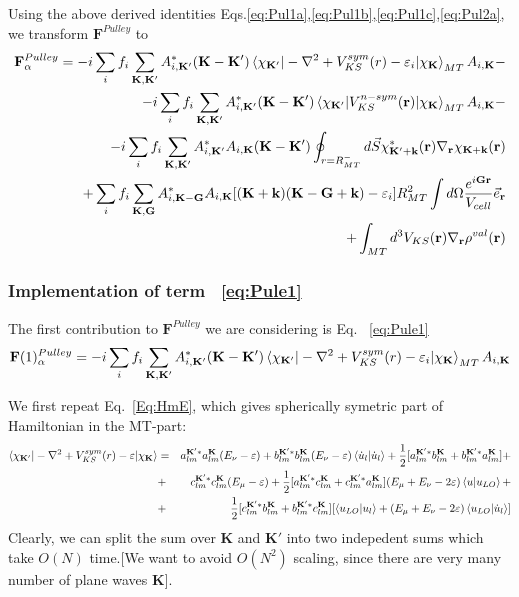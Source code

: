 \documentclass[aps,prb,floatfix,epsfig,singlecolumn,showpacs,preprintnumbers]{revtex4}
\newcommand{\vF}{{\mathbf{F}}}
\renewcommand{\vr}{{\mathbf{r}}}
\newcommand{\vk}{{\mathbf{k}}}
\newcommand{\vK}{{\mathbf{K}}}
\newcommand{\vG}{{\mathbf{G}}}
\begin{document}
Using the above derived identities
Eqs.\ref{eq:Pul1a},\ref{eq:Pul1b},\ref{eq:Pul1c},\ref{eq:Pul2a}, we transform
$\vF^{Pulley}$ to 
\begin{eqnarray}
\vF^{Pulley}_\alpha = 
-i\sum_i f_i \sum_{\vK,\vK'} A_{i,\vK'}^* 
(\vK-\vK')\braket{ \chi_{\vK'}  |-\nabla^2+V^{sym}_{KS}(r)-\varepsilon_i|\chi_{\vK}}_{MT}A_{i,\vK}-
\label{eq:Pule1}\\
-i\sum_i f_i \sum_{\vK,\vK'} A_{i,\vK'}^* 
(\vK-\vK')\braket{ \chi_{\vK'}  |V_{KS}^{n-sym}(\vr)|\chi_{\vK}}_{MT}A_{i,\vK}-
\label{eq:Pule2}
\\
-i\sum_i f_i \sum_{\vK,\vK'} A_{i,\vK'}^* A_{i,\vK}
(\vK-\vK') \oint_{r=R_{MT}^-} d\vec{S} \chi_{\vK'+\vk}^*(\vr)  \nabla_\vr\chi_{\vK+\vk}(\vr)
\label{eq:Pule3}
\\
+\sum_i f_i \sum_{\vK,\vG} A_{i,\vK-\vG}^*A_{i,\vK}  [(\vK+\vk)(\vK-\vG+\vk)-\varepsilon_i] R_{MT}^2 \int d\Omega \frac{e^{i\vG\vr}}{V_{cell}}\vec{e}_\vr
\label{eq:Pule4}\\
+\int_{MT} d^3 V_{KS}(\vr) \nabla_\vr \rho^{val}(\vr)
\label{eq:Pule5}
\end{eqnarray}


\subsubsection{Implementation of term ~\ref{eq:Pule1}}

The first contribution to $\vF^{Pulley}$ 
we are considering is Eq. ~\ref{eq:Pule1} 
\begin{eqnarray}
\vF(1)^{Pulley}_\alpha = 
-i\sum_i f_i \sum_{\vK,\vK'} A_{i,\vK'}^* 
(\vK-\vK')\braket{ \chi_{\vK'}  |-\nabla^2+V^{sym}_{KS}(r)-\varepsilon_i|\chi_{\vK}}_{MT}A_{i,\vK}
\end{eqnarray}

We first repeat Eq.~\ref{Eq:HmE}, which gives spherically symetric
part of Hamiltonian in the MT-part:
\begin{eqnarray}
\braket{\chi_{\vK'}|-\nabla^2+V^{sym}_{KS}(r)-\varepsilon|\chi_\vK}&=&
a^{\vK' *}_{lm}  a_{lm}^{\vK}(E_\nu-\varepsilon)  + 
b^{\vK' *}_{lm}  b_{lm}^\vK(E_\nu-\varepsilon)\braket{\dot{u}_l|\dot{u}_l} +
\frac{1}{2}[a^{\vK' *}_{lm} b_{lm}^\vK +b_{lm}^{\vK'*} a^{\vK}_{lm} ]+
%
\nonumber\\
&+&
c^{\vK' *}_{lm}  c_{lm}^\vK(E_{\mu}-\varepsilon) +
\frac{1}{2}[a^{\vK' *}_{lm} c_{lm}^\vK + c^{\vK' *}_{lm} a_{lm}^\vK ]  (E_{\mu}+E_\nu-2\varepsilon)\braket{u|u_{LO}} +
\nonumber\\
&+&
\frac{1}{2}[c^{\vK' *}_{lm}  b_{lm}^\vK + b^{\vK' *}_{lm}  c_{lm}^\vK ][ \braket{u_{LO}|u_l}  + (E_\mu+E_\nu-2\varepsilon)\braket{u_{LO}|\dot{u}_l} ]
\label{Eq:HmEn}
\end{eqnarray}
Clearly, we can split the sum over $\vK$ and $\vK'$ into two
indepedent sums which take $O(N)$ time.[We want to avoid $O(N^2)$
scaling, since there are very many number of plane waves $\vK$].
\end{document}
